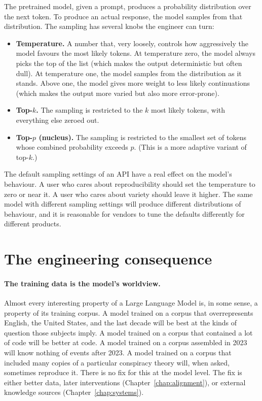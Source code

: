 The pretrained model, given a prompt, produces a probability
distribution over the next token. To produce an actual response,
the model samples from that distribution. The sampling has
several knobs the engineer can turn:

\begin{itemize}
  \item \textbf{Temperature.} A number that, very loosely,
        controls how aggressively the model favours the most
        likely tokens. At temperature zero, the model always
        picks the top of the list (which makes the output
        deterministic but often dull). At temperature one, the
        model samples from the distribution as it stands. Above
        one, the model gives more weight to less likely
        continuations (which makes the output more varied but
        also more error-prone).
  \item \textbf{Top-$k$.} The sampling is restricted to the $k$
        most likely tokens, with everything else zeroed out.
  \item \textbf{Top-$p$ (nucleus).} The sampling is restricted
        to the smallest set of tokens whose combined
        probability exceeds $p$. (This is a more adaptive
        variant of top-$k$.)
\end{itemize}

The default sampling settings of an API have a real effect on
the model's behaviour. A user who cares about reproducibility
should set the temperature to zero or near it. A user who cares
about variety should leave it higher. The same model with
different sampling settings will produce different distributions
of behaviour, and it is reasonable for vendors to tune the
defaults differently for different products.

\section{The engineering consequence}

\paragraph{The training data is the model's worldview.} Almost
every interesting property of a Large Language Model is, in some
sense, a property of its training corpus. A model trained on a
corpus that overrepresents English, the United States, and the
last decade will be best at the kinds of question those subjects
imply. A model trained on a corpus that contained a lot of code
will be better at code. A model trained on a corpus assembled
in 2023 will know nothing of events after 2023. A model trained
on a corpus that included many copies of a particular conspiracy
theory will, when asked, sometimes reproduce it. There is no
fix for this at the model level. The fix is either better data,
later interventions (Chapter~\ref{chap:alignment}), or external knowledge sources
(Chapter~\ref{chap:systems}).

